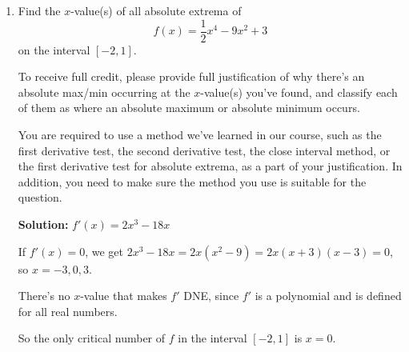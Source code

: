 \documentclass[11pt]{article}
\begin{document}
\begin{enumerate}
\begin{enumerate}
    {\large
        \[\text{Concave up: } {\color{blue} (-1, 3)}\]
    }

    {\large
        \[\text{Concave down: } {\color{blue} (-\infty, -1), (3, \infty)}\]
    }

    \item At what $x$-values does $f(x)$ have its critical numbers?

    {\large
        \[\text{Critical numbers: } {\color{blue} x=-2, 0, 5}\]
    }

    \item At what $x$-values does $f(x)$ have its inflection points?

    {\large
        \[\text{Inflection points ($x$-value(s) only): } {\color{blue} x=-1, 3}\]
    }
\end{enumerate}


\newpage


\item Find the $x$-value(s) of all absolute extrema of  \[f(x)=\dfrac{1}{2}x^4-9x^2+3\] on the interval $[-2, 1]$.

To receive full credit, please provide full justification of why there's an absolute max/min occurring at the $x$-value(s) you've found, and classify each of them as where an absolute maximum or absolute minimum occurs.

You are required to use a method we've learned in our course, such as the first derivative test, the second derivative test, the close interval method, or the first derivative test for absolute extrema, as a part of your justification. In addition, you need to make sure the method you use is suitable for the question.

 {\color{blue}\textbf{Solution:} 
    $f'(x)=2x^3-18x$

    If $f'(x)=0$, we get $2x^3-18x=2x(x^2-9)=2x(x+3)(x-3)=0$, so $x=-3, 0, 3$.

    There's no $x$-value that makes $f'$ DNE, since $f'$ is a polynomial and is defined for all real numbers.

    So the only critical number of $f$ in the interval $[-2, 1]$ is $x=0$.

}
\end{enumerate}
\end{document}

